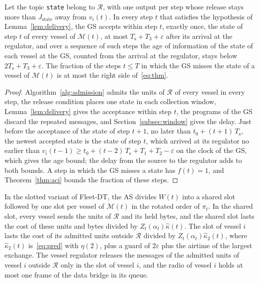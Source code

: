 \begin{corollary}\label{cor:state}
Let the topic \texttt{state} belong to $\mathcal{R}$, with one output per step whose release stays more than $J_{\mathrm{state}}$ away from $v_i(t)$. In every step $t$ that satisfies the hypothesis of Lemma~\ref{lem:delivery}, the GS accepts within step $t$, exactly once, the state of step $t$ of every vessel of $\mathcal{M}(t)$, at most $T_{\mathrm{s}} + T_3 + \varepsilon$ after its arrival at the regulator, and over a sequence of such steps the age of information of the state of each vessel at the GS, counted from the arrival at the regulator, stays below $2T_{\mathrm{s}} + T_3 + \varepsilon$. The fraction of the steps $t \leq T$ in which the GS misses the state of a vessel of $\mathcal{M}(t)$ is at most the right side of~\eqref{eq:thm}.
\end{corollary}
\begin{proof}
Algorithm~\ref{alg:admission} admits the units of $\mathcal{R}$ of every vessel in every step, the release condition places one state in each collection window, Lemma~\ref{lem:delivery} gives the acceptance within step $t$, the programs of the GS discard the repeated messages, and Section~\ref{subsec:window} gives the delay. Just before the acceptance of the state of step $t+1$, no later than $t_0 + (t+1)\,T_{\mathrm{s}}$, the newest accepted state is the state of step $t$, which arrived at its regulator no earlier than $v_i(t-1) \geq t_0 + (t-2)\,T_{\mathrm{s}} + T_1 + T_2 - \varepsilon$ on the clock of the GS, which gives the age bound; the delay from the source to the regulator adds to both bounds. A step in which the GS misses a state has $f(t) = 1$, and Theorem~\ref{thm:aci} bounds the fraction of these steps.
\end{proof}

\begin{definition}\label{def:tdma}
In the slotted variant of Fleet-DT, the AS divides $W(t)$ into a shared slot followed by one slot per vessel of $\mathcal{M}(t)$ in the rotated order of $\pi_t$. In the shared slot, every vessel sends the units of $\mathcal{R}$ and its held bytes, and the shared slot lasts the cost of these units and bytes divided by $Z_t(\alpha_t)\hat{\kappa}(t)$. The slot of vessel $i$ lasts the cost of its admitted units outside $\mathcal{R}$ divided by $Z_t(\alpha_t)\hat{\kappa}_2(t)$, where $\hat{\kappa}_2(t)$ is~\eqref{eq:pred} with $\eta(2)$, plus a guard of $2\varepsilon$ plus the airtime of the largest exchange. The vessel regulator releases the messages of the admitted units of vessel $i$ outside $\mathcal{R}$ only in the slot of vessel $i$, and the radio of vessel $i$ holds at most one frame of the data bridge in its queue.
\end{definition}

